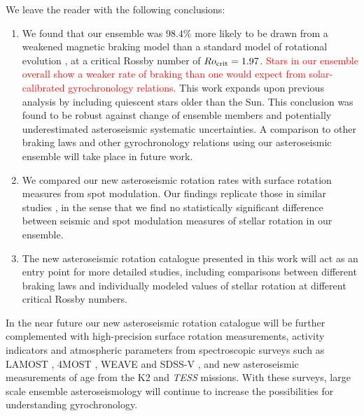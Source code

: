 \documentclass[12pt]{article}
\newcommand{\tess}{\emph{TESS}\xspace}
\newcommand{\ktwo}{K2\xspace}
\newcommand{\rtwo}[1]{\textcolor{red}{{#1}}}
\begin{document}
We leave the reader with the following conclusions:
\begin{enumerate}
	\item We found that our ensemble was $98.4\%$ more likely to be drawn from a weakened magnetic braking model than a standard model of rotational evolution \cite{vansaders+pinsonneault2013}, at a critical Rossby number of $Ro_{\rm{crit}} = 1.97$. \rtwo{Stars in our ensemble overall show a weaker rate of braking than one would expect from solar-calibrated gyrochronology relations.} This work expands upon previous analysis \cite{vansaders+2019} by including quiescent stars older than the Sun. This conclusion was found to be robust against change of ensemble members and potentially underestimated asteroseismic systematic uncertainties. A comparison to other braking laws \cite{matt+2015} and other gyrochronology relations \cite{barnes2010} using our asteroseismic ensemble will take place in future work.
	
	\item We compared our new asteroseismic rotation rates with surface rotation measures from spot modulation. Our findings replicate those in similar studies \cite{nielsen+2015,benomar+2015}, in the sense that we find no statistically significant difference between seismic and spot modulation measures of stellar rotation in our ensemble.
	
	\item The new asteroseismic rotation catalogue presented in this work will act as an entry point for more detailed studies, including comparisons between different braking laws and individually modeled values of stellar rotation at different critical Rossby numbers.
	
\end{enumerate}

In the near future our new asteroseismic rotation catalogue will be further complemented with high-precision surface rotation measurements, activity indicators and atmospheric parameters from spectroscopic surveys such as LAMOST \cite{deng+2012}, 4MOST \cite{dejong+2014}, WEAVE \cite{dalton+2014} and SDSS-V \cite{blanton+2019, kollmeier+2019}, and new asteroseismic measurements of age from the \ktwo and \tess missions. With these surveys, large scale ensemble asteroseismology will continue to increase the possibilities for understanding gyrochronology.\\


%
\end{document}
